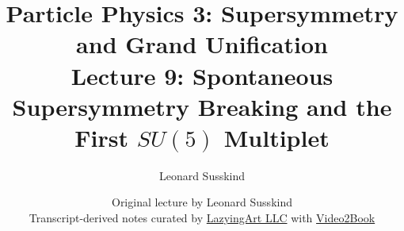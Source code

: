 \documentclass[11pt,oneside]{book}
\begin{document}
\frontmatter
\title{Particle Physics 3: Supersymmetry and Grand Unification\\[0.5em]
\large Lecture 9: Spontaneous Supersymmetry Breaking and the First \(SU(5)\) Multiplet}
\author{Leonard Susskind}
\date{Original lecture by Leonard Susskind\\[0.4em]
Transcript-derived notes curated by
\href{https://lazying.art}{LazyingArt LLC} with
\href{https://github.com/lachlanchen/Video2Book}{Video2Book}}
\maketitle
\mainmatter

\end{document}
